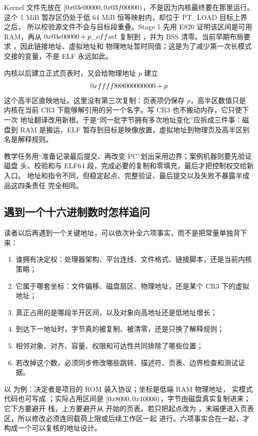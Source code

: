 Kernel 文件先放在
\([0x03e00000,0x03f00000)\)，不是因为内核最终要在那里运行。
这个 1 MiB 暂存区仍处于低 64 MiB 恒等映射内，却位于 PT\_LOAD 目标上界之后，
所以校验源文件不会与目标段重叠。Stage 1 先用 E820 证明该区间是可用 RAM，再从
\(0x03e00000+p\_offset\) 复制到 ，并为 BSS
清零。当前早期布局要求 ，因此链接地址、虚拟地址和
物理地址暂时同值；这是为了减少第一次长模式交接的变量，不是 ELF 永远如此。

内核以后建立正式页表时，又会给物理地址 \(p\) 建立
\[
0xffff888000000000+p
\]
这个高半区直映地址。这里没有第三次复制：页表项仍保存 \(p\)，高半区数值只是
内核在当前 CR3 下能够解引用的另一个名字。写 CR3 也不搬动内存，它只使下一次
地址翻译改用新根。于是“同一批字节拥有多次地址变化”应拆成三件事：磁盘到 RAM
是搬运，ELF 暂存到目标是映像放置，虚拟地址到物理页及高半区别名是解释规则。

教学任务用“准备记录最后提交、再改变 PC”划出采用边界；案例机器则要先验证磁盘
头、校验和与 ELF64 段，完成必要的复制和零填充，最后才把控制权交给新入口。
地址和指令不同，但稳定起点、完整验证、最后提交以及失败不暴露半成品这四条责任
完全相同。

\subsection{遇到一个十六进制数时怎样追问}

读者以后再遇到一个关键地址，可以依次补全六项事实，而不是把常量单独背下来：

\begin{enumerate}
  \item 谁拥有决定权：处理器架构、平台连线、文件格式、链接脚本，还是当前内核策略；
  \item 它属于哪套坐标：文件偏移、磁盘扇区、物理地址，还是某个 CR3 下的虚拟地址；
  \item 真正占用的是哪段半开区间，以及对象向高地址还是低地址增长；
  \item 到达下一地址时，字节真的被复制、被清零，还是只换了解释规则；
  \item 相邻对象、对齐、容量、权限和可达性共同排除了哪些位置；
  \item 若改掉这个数，必须同步修改哪些跳转、描述符、页表、边界检查和测试证据。
\end{enumerate}

以  为例：决定者是项目的 ROM 装入协议；坐标是低端 RAM 物理地址，
实模式代码也可写成 ；实际占用区间是
\([0x8000,0x10000)\)，字节由磁盘真实复制进来；它下方要避开
 栈，上方要避开从  开始的页表。若只把起点改为
，末端便进入页表区，所以修改必须连同载荷上限或后续工作区一起
进行。六项事实合在一起，才构成一个可以复核的地址设计。
